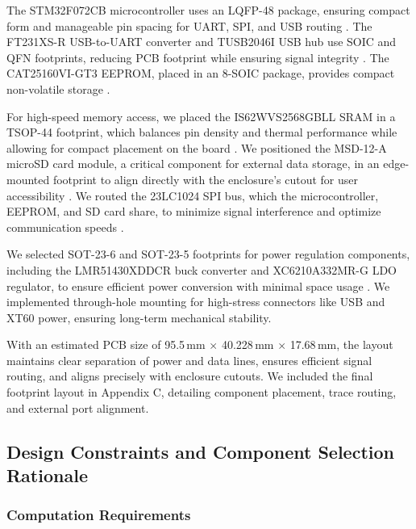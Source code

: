 \documentclass[12pt]{article}
\begin{document}
\par The STM32F072CB microcontroller uses an LQFP-48 package, ensuring compact form and manageable pin spacing for UART, SPI, and USB routing \cite{st2023stm32}. The FT231XS-R USB-to-UART converter and TUSB2046I USB hub use SOIC and QFN footprints, reducing PCB footprint while ensuring signal integrity \cite{ftdi2023ft231x} \cite{ti2023tusb}. The CAT25160VI-GT3 EEPROM, placed in an 8-SOIC package, provides compact non-volatile storage \cite{onsemi2023cat}.

\par For high-speed memory access, we placed the IS62WVS2568GBLL SRAM in a TSOP-44 footprint, which balances pin density and thermal performance while allowing for compact placement on the board \cite{issi2023sram}. We positioned the MSD-12-A microSD card module, a critical component for external data storage, in an edge-mounted footprint to align directly with the enclosure’s cutout for user accessibility \cite{samesky2023msd}. We routed the 23LC1024 SPI bus, which the microcontroller, EEPROM, and SD card share, to minimize signal interference and optimize communication speeds \cite{microchip2023sram}.

\par We selected SOT-23-6 and SOT-23-5 footprints for power regulation components, including the LMR51430XDDCR buck converter and XC6210A332MR-G LDO regulator, to ensure efficient power conversion with minimal space usage \cite{ti2023stepdown} \cite{torex2023ldo}. We implemented through-hole mounting for high-stress connectors like USB and XT60 power, ensuring long-term mechanical stability.

\par With an estimated PCB size of 95.5\,mm $\times$ 40.228\,mm $\times$ 17.68\,mm, the layout maintains clear separation of power and data lines, ensures efficient signal routing, and aligns precisely with enclosure cutouts. We included the final footprint layout in Appendix C, detailing component placement, trace routing, and external port alignment.

\subsection{Design Constraints and Component Selection Rationale}

\subsubsection{Computation Requirements}
\end{document}
